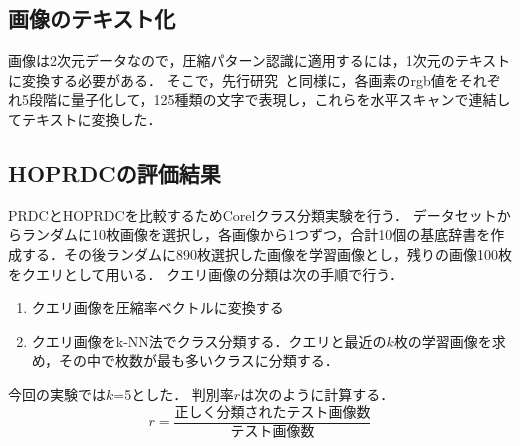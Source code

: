 \subsection{画像のテキスト化}
画像は2次元データなので，圧縮パターン認識に適用するには，1次元のテキストに変換する必要がある．
そこで，先行研究~\cite{NMD}と同様に，各画素のrgb値をそれぞれ5段階に量子化して，125種類の文字で表現し，これらを水平スキャンで連結してテキストに変換した．

\subsection{HOPRDCの評価結果}
PRDCとHOPRDCを比較するためCorelクラス分類実験を行う．
データセットからランダムに10枚画像を選択し，各画像から1つずつ，合計10個の基底辞書を作成する．その後ランダムに890枚選択した画像を学習画像とし，残りの画像100枚をクエリとして用いる．
クエリ画像の分類は次の手順で行う．
\begin{enumerate}
	\item クエリ画像を圧縮率ベクトルに変換する
	\item クエリ画像をk-NN法でクラス分類する．クエリと最近の$k$枚の学習画像を求め，その中で枚数が最も多いクラスに分類する．
\end{enumerate}
今回の実験では$k$=5とした．
判別率$r$は次のように計算する．
\begin{equation}
r=\frac{正しく分類されたテスト画像数}{テスト画像数}
\end{equation}


